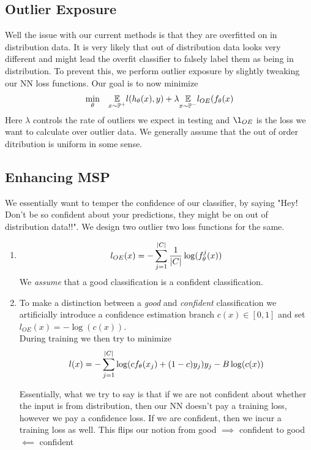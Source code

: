 \documentclass[11pt]{report}
\begin{document}
\subsection{Outlier Exposure}
Well the issue with our current methods is that they are overfitted on in distribution data. It is very likely that out of distribution data looks very different and might lead the overfit classifier to falsely label them as being in distribution. To prevent this, we perform outlier exposure by slightly tweaking our NN loss functions. Our goal is to now minimize
\begin{align}
    \begin{aligned}
            &\operatorname*{min}_{\theta}  && \underset{x \sim \mathbb{P}^+}{\mathbb{E}} l(h_\theta(x),y) + \lambda  \underset{x \sim \mathbb{P}^-}{\mathbb{E}} l_{OE}(f_\theta(x) \\
        \end{aligned} \nonumber
\end{align}
Here \(\lambda\) controls the rate of outliers we expect in testing and \(\l_{OE}\) is the loss we want to calculate over outlier data. We generally assume that the out of order ditribution is uniform in some sense.

\subsection{Enhancing MSP}
We essentially want to temper the confidence of our classifier, by saying "Hey! Don't be so confident about your predictions, they might be on out of distribution data!!". We design two outlier two loss functions for the same.
\vspace{1mm}
\begin{enumerate}
    \item \label{mpp:gen_0}
    \begin{align}
        l_{OE}(x)= - \sum_{j=1}^{|C|} \frac{1}{|C|} \log(f_\theta^j(x)) \nonumber
    \end{align}
    We \emph{assume} that a good classification is a confident classification.

    \item \label{mpp:gen_1} To make a distinction between a \emph{good} and \emph{confident} classification we artificially introduce a confidence estimation branch \(c(x) \in [0,1]\) and set \(l_{OE}(x)=-\log(c(x))\).\\
    \vspace{1mm}
    During training we then try to minimize
    \begin{align}
        l(x)= - \sum_{j=1}^{|C|} \log(cf_\theta(x_j)+(1-c)y_j)y_j -B\log(c(x)) \nonumber
    \end{align}

    Essentially, what we try to say is that if we are not confident about whether the input is from distribution, then our NN doesn't pay a training loss, however we pay a confidence loss. If we are confident, then we incur a training loss as well. This flips our notion from good \(\implies\) confident to good \(\impliedby\) confident
    
\end{enumerate}
\end{document}
